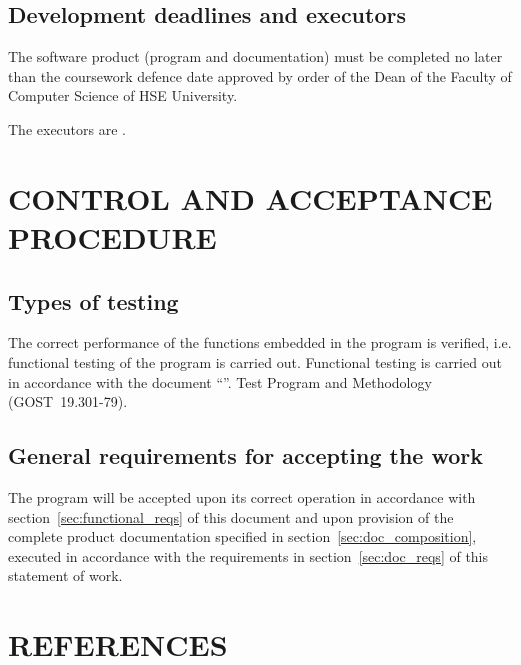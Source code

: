 \documentclass[12pt,a4paper]{extarticle}
\begin{document}
\subsection{Development deadlines and executors}

The software product (program and documentation) must be completed no later than the coursework defence date approved by order of the Dean of the Faculty of Computer Science of HSE University.

The executors are \hseAuthorsList.

\clearpage

\section{CONTROL AND ACCEPTANCE PROCEDURE}

\subsection{Types of testing}

The correct performance of the functions embedded in the program is verified, i.e. functional testing of the program is carried out. Functional testing is carried out in accordance with the document \enquote{\projectname}. Test Program and Methodology (GOST~19.301-79).

\subsection{General requirements for accepting the work}

The program will be accepted upon its correct operation in accordance with section~\ref{sec:functional_reqs} of this document and upon provision of the complete product documentation specified in section~\ref{sec:doc_composition}, executed in accordance with the requirements in section~\ref{sec:doc_reqs} of this statement of work.

\clearpage
\pagestyle{appendix}

\section*{REFERENCES}
\end{document}
